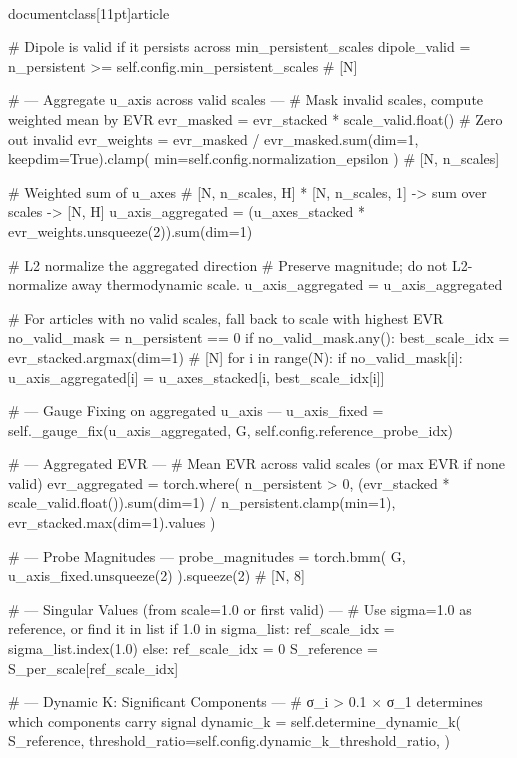 \\documentclass[11pt]{article}
\begin{document}
\begin{CodeBlock}
        # Dipole is valid if it persists across min_persistent_scales
        dipole_valid = n_persistent >= self.config.min_persistent_scales  # [N]

        # --- Aggregate u_axis across valid scales ---
        # Mask invalid scales, compute weighted mean by EVR
        evr_masked = evr_stacked * scale_valid.float()  # Zero out invalid
        evr_weights = evr_masked / evr_masked.sum(dim=1, keepdim=True).clamp(
            min=self.config.normalization_epsilon
        )  # [N, n_scales]

        # Weighted sum of u_axes
        # [N, n_scales, H] * [N, n_scales, 1] -> sum over scales -> [N, H]
        u_axis_aggregated = (u_axes_stacked * evr_weights.unsqueeze(2)).sum(dim=1)

        # L2 normalize the aggregated direction
        # Preserve magnitude; do not L2-normalize away thermodynamic scale.
        u_axis_aggregated = u_axis_aggregated

        # For articles with no valid scales, fall back to scale with highest EVR
        no_valid_mask = n_persistent == 0
        if no_valid_mask.any():
            best_scale_idx = evr_stacked.argmax(dim=1)  # [N]
            for i in range(N):
                if no_valid_mask[i]:
                    u_axis_aggregated[i] = u_axes_stacked[i, best_scale_idx[i]]

        # --- Gauge Fixing on aggregated u_axis ---
        u_axis_fixed = self._gauge_fix(u_axis_aggregated, G, self.config.reference_probe_idx)

        # --- Aggregated EVR ---
        # Mean EVR across valid scales (or max EVR if none valid)
        evr_aggregated = torch.where(
            n_persistent > 0,
            (evr_stacked * scale_valid.float()).sum(dim=1) / n_persistent.clamp(min=1),
            evr_stacked.max(dim=1).values
        )

        # --- Probe Magnitudes ---
        probe_magnitudes = torch.bmm(
            G, u_axis_fixed.unsqueeze(2)
        ).squeeze(2)  # [N, 8]

        # --- Singular Values (from scale=1.0 or first valid) ---
        # Use sigma=1.0 as reference, or find it in list
        if 1.0 in sigma_list:
            ref_scale_idx = sigma_list.index(1.0)
        else:
            ref_scale_idx = 0
        S_reference = S_per_scale[ref_scale_idx]

        # --- Dynamic K: Significant Components ---
        # σ_i > 0.1 × σ_1 determines which components carry signal
        dynamic_k = self.determine_dynamic_k(
            S_reference,
            threshold_ratio=self.config.dynamic_k_threshold_ratio,
        )


\end{CodeBlock}
\end{document}
